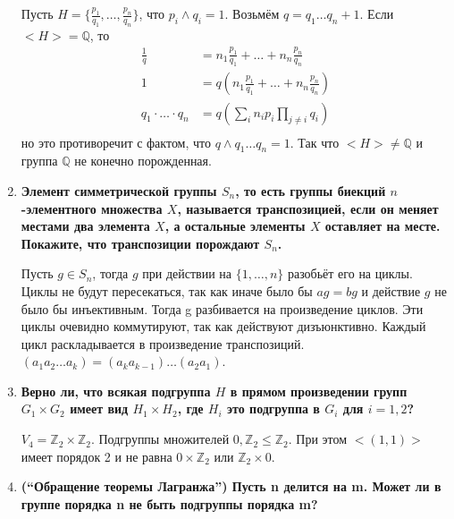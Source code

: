 \documentclass{article}
\begin{document}
\begin{enumerate}
        Пусть $H=\{\frac{p_1}{q_1},\ldots,\frac{p_n}{q_n}\}$, что $p_i\wedge
        q_i=1$. Возьмём $q=q_1\ldots q_n+1$. Если $<H>=\mathbb{Q}$, то
        \begin{align*}
            \frac{1}{q}&=n_1\frac{p_1}{q_1}+\ldots+n_n\frac{p_n}{q_n}\\
            1&=q(n_1\frac{p_1}{q_1}+\ldots+n_n\frac{p_n}{q_n})\\
            q_1\cdot\ldots\cdot q_n&=q(\sum_in_ip_i\prod_{j\neq i}q_i)\\
        \end{align*}
        но это противоречит с фактом, что $q\wedge q_1\ldots q_n=1$.
        Так что $<H>\neq\mathbb{Q}$ и группа $\mathbb{Q}$ не конечно порожденная.
    \item \textbf{Элемент симметрической группы $S_n$, то есть группы биекций
        $n$-элементного множества $X$, называется транспозицией, если он меняет
        местами два элемента $X$, а остальные элементы $X$ оставляет на месте.
        Покажите, что транспозиции порождают $S_n$.}

        Пусть $g\in S_n$, тогда $g$ при действии на $\{1,\ldots,n\}$ разобьёт
        его на циклы. Циклы не будут
        пересекаться, так как иначе было бы $ag=bg$ и действие $g$ не было бы
        инъективным. Тогда g разбивается на произведение циклов. Эти циклы
        очевидно коммутируют, так как действуют дизъюнктивно. Каждый цикл
        раскладывается в произведение транспозиций. $(a_1a_2\ldots a_k)=
        (a_ka_{k-1})\ldots(a_2a_1)$.
    \item \textbf{Верно ли, что всякая подгруппа $H$ в прямом произведении
        групп $G_1\times G_2$ имеет вид $H_1\times H_2$, где $H_i$ это подгруппа
        в $G_i$ для $i=1,2$?}

        $V_4=\mathbb{Z}_2\times\mathbb{Z}_2$. Подгруппы множителей $0,
        \mathbb{Z}_2\leq\mathbb{Z}_2$. При этом $<(1,1)>$ имеет порядок 2 и
        не равна $0\times\mathbb{Z}_2$ или $\mathbb{Z}_2\times 0$.
    \item \textbf{(“Обращение теоремы Лагранжа”) Пусть n делится на m.
        Может ли в группе порядка n не быть подгруппы порядка m?}


\end{enumerate}
\end{document}
